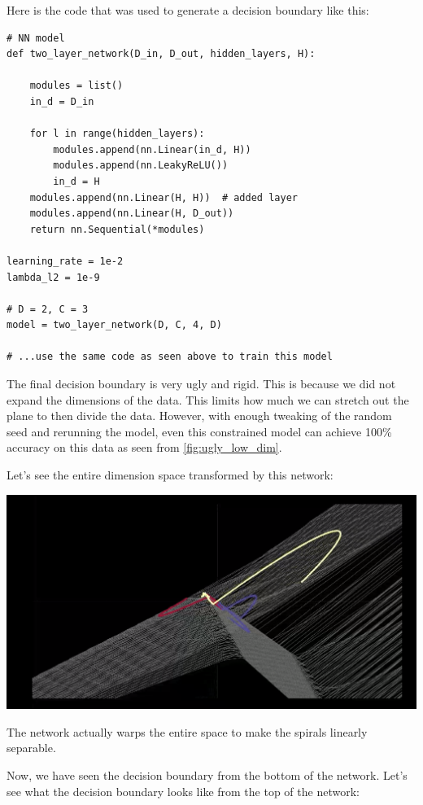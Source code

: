 Here is the code that was used to generate a decision boundary like this:

\begin{verbatim}
# NN model
def two_layer_network(D_in, D_out, hidden_layers, H):

    modules = list()
    in_d = D_in

    for l in range(hidden_layers):
        modules.append(nn.Linear(in_d, H))
        modules.append(nn.LeakyReLU())
        in_d = H
    modules.append(nn.Linear(H, H))  # added layer
    modules.append(nn.Linear(H, D_out))
    return nn.Sequential(*modules)

learning_rate = 1e-2
lambda_l2 = 1e-9

# D = 2, C = 3
model = two_layer_network(D, C, 4, D)
 
# ...use the same code as seen above to train this model
\end{verbatim}

The final decision boundary is very ugly and rigid. 
This is because we did not expand the dimensions of the data. 
This limits how much we can stretch out the plane to then divide the data. 
However, with enough tweaking of the random seed and rerunning the model, even this constrained model can achieve 100\% accuracy on this data as seen from \cref{fig:ugly_low_dim}. 

Let's see the entire dimension space transformed by this network:

\begin{center}
	\includegraphics[width=0.85\linewidth]{lectures/03-a/images/stretch.png}
\end{center}

The network actually warps the entire space to make the spirals linearly separable. 

Now, we have seen the decision boundary from the bottom of the network. 
Let's see what the decision boundary looks like from the top of the network:


